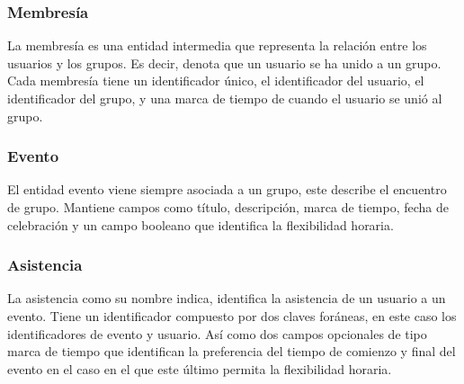 \subsubsection{Membresía}
La membresía es una entidad intermedia que representa la relación entre los usuarios y los grupos. Es decir, denota que un usuario se ha unido a un grupo. Cada membresía tiene un identificador único, el identificador del usuario, el identificador del grupo, y una marca de tiempo de cuando el usuario se unió al grupo.

\subsubsection{Evento}
El entidad evento viene siempre asociada a un grupo, este describe el encuentro de grupo. Mantiene campos como título, descripción, marca de tiempo, fecha de celebración y un campo booleano que identifica la flexibilidad horaria.

\subsubsection{Asistencia}
La asistencia como su nombre indica, identifica la asistencia de un usuario a un evento. Tiene un identificador compuesto por dos claves foráneas, en este caso los identificadores de evento y usuario. Así como dos campos opcionales de tipo marca de tiempo que identifican la preferencia del tiempo de comienzo y final del evento en el caso en el que este último permita la flexibilidad horaria.


